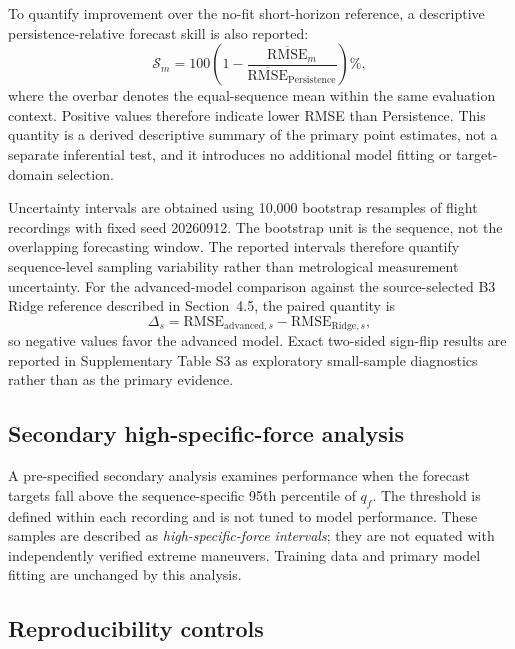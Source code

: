\documentclass[preprint,12pt]{elsarticle}
\newcommand{\qf}{q_f}
\begin{document}
To quantify improvement over the no-fit short-horizon reference, a descriptive persistence-relative forecast skill is also reported:
\begin{equation}
\mathcal{S}_m = 100\left(1-\frac{\overline{\mathrm{RMSE}}_m}{\overline{\mathrm{RMSE}}_{\mathrm{Persistence}}}\right)\%,
\label{eq:persistence_skill}
\end{equation}
where the overbar denotes the equal-sequence mean within the same evaluation context. Positive values therefore indicate lower RMSE than Persistence. This quantity is a derived descriptive summary of the primary point estimates, not a separate inferential test, and it introduces no additional model fitting or target-domain selection.

Uncertainty intervals are obtained using 10,000 bootstrap resamples of flight recordings with fixed seed 20260912. The bootstrap unit is the sequence, not the overlapping forecasting window. The reported intervals therefore quantify sequence-level sampling variability rather than metrological measurement uncertainty. For the advanced-model comparison against the source-selected B3 Ridge reference described in Section~4.5, the paired quantity is
\begin{equation}
\Delta_s=\mathrm{RMSE}_{\mathrm{advanced},s}-\mathrm{RMSE}_{\mathrm{Ridge},s},
\label{eq:delta}
\end{equation}
so negative values favor the advanced model. Exact two-sided sign-flip results are reported in Supplementary Table S3 as exploratory small-sample diagnostics rather than as the primary evidence.

\subsection{Secondary high-specific-force analysis}

A pre-specified secondary analysis examines performance when the forecast targets fall above the sequence-specific 95th percentile of $\qf$. The threshold is defined within each recording and is not tuned to model performance. These samples are described as \emph{high-specific-force intervals}; they are not equated with independently verified extreme maneuvers. Training data and primary model fitting are unchanged by this analysis.

\subsection{Reproducibility controls}
\end{document}
